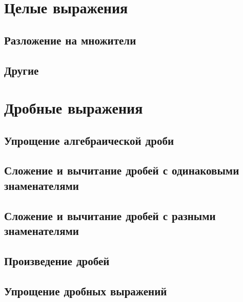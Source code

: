 \documentclass[10pt, a4paper]{article}
\begin{document}
\section{Целые выражения}
	\subsection{Разложение на множители}
	\subsection{Другие}
\section{Дробные выражения}
	\subsection{Упрощение алгебраической дроби}
	\subsection{Сложение и вычитание дробей с одинаковыми знаменателями}
	\subsection{Сложение и вычитание дробей с разными знаменателями}
	\subsection{Произведение дробей}
	\subsection{Упрощение дробных выражений}
\end{document}

